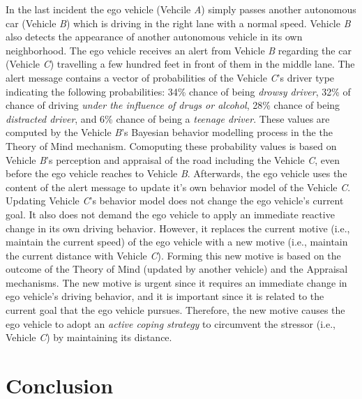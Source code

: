 \documentclass[journal, 11pt]{IEEEtran}
\begin{document}
In the last incident the ego vehicle (Vehcile \textit{A}) simply passes another
autonomous car (Vehicle \textit{B}) which is driving in the right lane with a
normal speed. Vehicle \textit{B} also detects the appearance of another
autonomous vehicle in its own neighborhood. The ego vehicle receives an alert
from Vehicle \textit{B} regarding the car (Vehicle \textit{C}) travelling a few
hundred feet in front of them in the middle lane. The alert message contains a
vector of probabilities of the Vehicle \textit{C}'s driver type indicating the
following probabilities: 34\% chance of being \textit{drowsy driver}, 32\% of
chance of driving \textit{under the influence of drugs or alcohol}, 28\% chance
of being \textit{distracted driver}, and 6\% chance of being a \textit{teenage
driver}. These values are computed by the Vehicle \textit{B}'s Bayesian behavior
modelling process in the the Theory of Mind mechanism. Comoputing these
probability values is based on Vehicle \textit{B}'s perception and appraisal of
the road including the Vehicle \textit{C}, even before the ego vehicle reaches
to Vehicle \textit{B}. Afterwards, the ego vehicle uses the content of the alert
message to update it's own behavior model of the Vehicle \textit{C}. Updating
Vehicle \textit{C}'s behavior model does not change the ego vehicle's current
goal. It also does not demand the ego vehicle to apply an immediate reactive
change in its own driving behavior. However, it replaces the current motive
(i.e., maintain the current speed) of the ego vehicle with a new motive (i.e.,
maintain the current distance with Vehicle \textit{C}). Forming this new motive
is based on the outcome of the Theory of Mind (updated by another vehicle) and
the Appraisal mechanisms. The new motive is urgent since it requires an
immediate change in ego vehicle's driving behavior, and it is important since it
is related to the current goal that the ego vehicle pursues. Therefore, the new
motive causes the ego vehicle to adopt an \textit{active coping strategy} to
circumvent the stressor (i.e., Vehicle \textit{C}) by maintaining its distance.

\section{Conclusion}
\label{Conc}
%



% 
\end{document}
